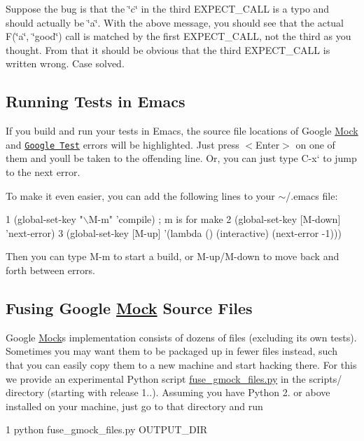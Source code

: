 Suppose the bug is that the {\ttfamily \char`\"{}c\char`\"{}} in the third {\ttfamily E\+X\+P\+E\+C\+T\+\_\+\+C\+A\+LL} is a typo and should actually be {\ttfamily \char`\"{}a\char`\"{}}. With the above message, you should see that the actual {\ttfamily F(\char`\"{}a\char`\"{}, \char`\"{}good\char`\"{})} call is matched by the first {\ttfamily E\+X\+P\+E\+C\+T\+\_\+\+C\+A\+LL}, not the third as you thought. From that it should be obvious that the third {\ttfamily E\+X\+P\+E\+C\+T\+\_\+\+C\+A\+LL} is written wrong. Case solved.

\subsection*{Running Tests in Emacs}

If you build and run your tests in Emacs, the source file locations of Google \hyperlink{class_mock}{Mock} and \href{../../googletest/}{\tt Google Test} errors will be highlighted. Just press {\ttfamily $<$Enter$>$} on one of them and you\textquotesingle{}ll be taken to the offending line. Or, you can just type {\ttfamily C-\/x}` to jump to the next error.

To make it even easier, you can add the following lines to your {\ttfamily $\sim$/.emacs} file\+:


\begin{DoxyCode}
1 (global-set-key "\(\backslash\)M-m"   'compile)  ; m is for make
2 (global-set-key [M-down] 'next-error)
3 (global-set-key [M-up]   '(lambda () (interactive) (next-error -1)))
\end{DoxyCode}


Then you can type {\ttfamily M-\/m} to start a build, or {\ttfamily M-\/up}/{\ttfamily M-\/down} to move back and forth between errors.

\subsection*{Fusing Google \hyperlink{class_mock}{Mock} Source Files}

Google \hyperlink{class_mock}{Mock}\textquotesingle{}s implementation consists of dozens of files (excluding its own tests). Sometimes you may want them to be packaged up in fewer files instead, such that you can easily copy them to a new machine and start hacking there. For this we provide an experimental Python script {\ttfamily \hyperlink{fuse__gmock__files_8py}{fuse\+\_\+gmock\+\_\+files.\+py}} in the {\ttfamily scripts/} directory (starting with release 1..). Assuming you have Python 2. or above installed on your machine, just go to that directory and run 
\begin{DoxyCode}
1 python fuse\_gmock\_files.py OUTPUT\_DIR
\end{DoxyCode}


